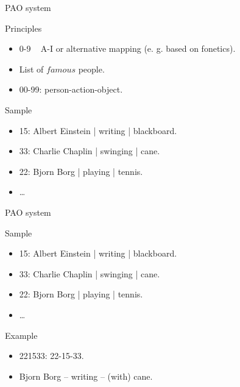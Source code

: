 \begin{frame}{PAO system}
  \begin{block}{Principles}
    \begin{itemize}
      \item 0-9 ~ A-I or alternative mapping (e. g. based on fonetics). 
      \item List of \(famous\) people.
      \item 00-99: person-action-object.
    \end{itemize}
  \end{block}
  \begin{block}{Sample}
    \begin{itemize}
      \item 15: Albert Einstein | writing | blackboard. 
      \item 33: Charlie Chaplin | swinging | cane.
      \item 22: Bjorn Borg | playing | tennis.
      \item \dots
    \end{itemize}
  \end{block}
\end{frame}

\begin{frame}{PAO system}
  \begin{block}{Sample}
    \begin{itemize}
      \item 15: Albert Einstein | writing | blackboard. 
      \item 33: Charlie Chaplin | swinging | cane.
      \item 22: Bjorn Borg | playing | tennis.
      \item \dots
    \end{itemize}
  \end{block}
  \begin{block}{Example}
    \begin{itemize}
      \item 221533:  22-15-33. 
      \item Bjorn Borg -- writing -- (with) cane. 
    \end{itemize}
  \end{block}
\end{frame}
